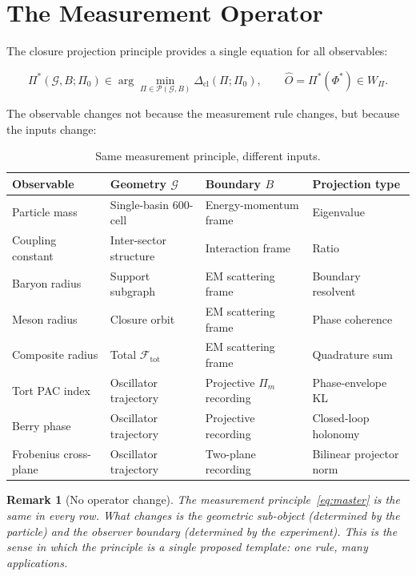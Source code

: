 \documentclass[12pt]{article}
\newtheorem{remark}[theorem]{Remark}
\newcommand{\Fcal}{\mathcal{F}}
\newcommand{\Pcal}{\mathcal{P}}
\newcommand{\Gcal}{\mathcal{G}}
\newcommand{\Dcl}{\Delta_{\mathrm{cl}}}
\begin{document}
\section{The Measurement Operator}\label{sec:operator}

The closure projection principle provides a single equation for all observables:

\begin{equation}\label{eq:master}
    \Pi^*(\Gcal, B; \Pi_0) \in \arg\min_{\Pi \in \Pcal(\Gcal, B)} \Dcl(\Pi;\Pi_0), \qquad \hat{O} = \Pi^*(\Phi^*) \in W_\Pi.
\end{equation}

The observable changes not because the measurement rule changes, but because the inputs change:

\begin{table}[ht]
\centering
\caption{Same measurement principle, different inputs.}
\label{tab:inputs}
\begin{tabular}{@{}llll@{}}
\toprule
Observable & Geometry $\Gcal$ & Boundary $B$ & Projection type \\
\midrule
Particle mass & Single-basin 600-cell & Energy-momentum frame & Eigenvalue \\
Coupling constant & Inter-sector structure & Interaction frame & Ratio \\
Baryon radius & Support subgraph & EM scattering frame & Boundary resolvent \\
Meson radius & Closure orbit & EM scattering frame & Phase coherence \\
Composite radius & Total $\Fcal_{\mathrm{tot}}$ & EM scattering frame & Quadrature sum \\
Tort PAC index & Oscillator trajectory & Projective $\Pi_m$ recording & Phase-envelope KL \\
Berry phase & Oscillator trajectory & Projective recording & Closed-loop holonomy \\
Frobenius cross-plane & Oscillator trajectory & Two-plane recording & Bilinear projector norm \\
\bottomrule
\end{tabular}
\end{table}

\begin{remark}[No operator change]
The measurement principle~\eqref{eq:master} is the same in every row. What changes is the geometric sub-object (determined by the particle) and the observer boundary (determined by the experiment). This is the sense in which the principle is a single proposed template: one rule, many applications.
\end{remark}
\end{document}
